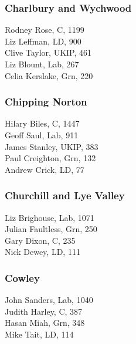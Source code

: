 \documentclass[a4paper,openany,10pt]{book}
\begin{document}
\subsubsection*{Charlbury and Wychwood}



Rodney Rose, C, 1199\\
Liz Leffman, LD, 900\\
Clive Taylor, UKIP, 461\\
Liz Blount, Lab, 267\\
Celia Kerslake, Grn, 220\\


\subsubsection*{Chipping Norton}



Hilary Biles, C, 1447\\
Geoff Saul, Lab, 911\\
James Stanley, UKIP, 383\\
Paul Creighton, Grn, 132\\
Andrew Crick, LD, 77\\


\subsubsection*{Churchill and Lye Valley}



Liz Brighouse, Lab, 1071\\
Julian Faultless, Grn, 250\\
Gary Dixon, C, 235\\
Nick Dewey, LD, 111\\


\subsubsection*{Cowley}



John Sanders, Lab, 1040\\
Judith Harley, C, 387\\
Hasan Miah, Grn, 348\\
Mike Tait, LD, 114\\
\end{document}

